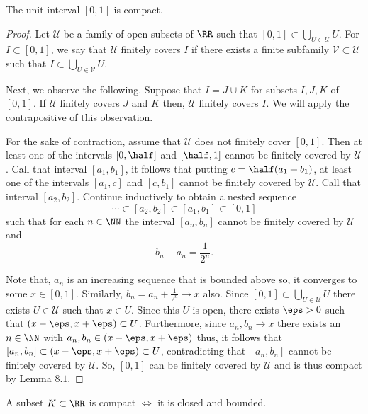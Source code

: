 \documentclass[12pt, a4paper]{article}
\begin{document}
\begin{theorem}
    The unit interval \([0,1]\) is compact.
\end{theorem}

\begin{proof}
    Let \(\mathcal{U}\) be a family of open subsets of \(\RR\) such that \([0,1] \subset \bigcup_{U\in \mathcal{U}} U\). For \(I \subset [0,1]\), we say that \underline{\(\mathcal{U}\) finitely covers \(I\)} if there exists a finite subfamily \(\mathcal{V} \subset \mathcal{U}\) such that \(I \subset \bigcup_{U \in \mathcal{V}} U\). 
    
    Next, we observe the following. Suppose that \(I = J \cup K\) for subsets \(I,J,K\) of \([0,1]\). If \(\mathcal{U}\) finitely covers \(J\) and \(K\) then, \(\mathcal{U}\) finitely covers \(I\). We will apply the contrapositive of this observation.
    
    For the sake of contraction, assume that \(\mathcal{U}\) does not finitely cover \([0,1]\). Then at least one of the intervals \(\left[ 0,\half \right]\) and \(\left[ \half,1 \right]\) cannot be finitely covered by \(\mathcal{U}\). Call that interval \([a_1,b_1]\), it follows that putting \(c = \half (a_1+b_1)\), at least one of the intervals \([a_1,c]\) and \([c,b_1]\) cannot be finitely covered by \(\mathcal{U}\). Call that interval \([a_2,b_2]\). Continue inductively to obtain a nested sequence 
    \[\cdots \subset [a_2,b_2] \subset [a_1,b_1] \subset[0,1]\]
    such that for each \(n \in \NN\) the interval \([a_n,b_n]\) cannot be finitely covered by \(\mathcal{U}\) and 
    \[b_n-a_n = \frac{1}{2^n}.\]
    
    Note that, \(a_n\) is an increasing sequence that is bounded above so, it converges to some \(x \in [0,1]\). Similarly, \(b_n = a_n + \frac{1}{2^n} \to x\) also.
    Since \([0,1] \subset \bigcup_{U \in \mathcal{U}}U\) there exists \(U \in \mathcal{U}\) such that \(x \in U\). Since this \(U\) is open, there exists \(\eps>0\) such that \((x-\eps,x+\eps)\subset U\). Furthermore, since \(a_n,b_n \to x\) there exists an \(n \in \NN\) with \(a_n, b_n \in (x-\eps,x+\eps)\) thus, it follows that \([a_n,b_n] \subset (x-\eps,x+\eps) \subset U\), contradicting that \([a_n,b_n]\) cannot be finitely covered by \(\mathcal{U}\). So, \([0,1]\) can be finitely covered by \(\mathcal{U}\) and is thus compact by Lemma \(8.1\).
\end{proof}

\begin{mdthm}
    A subset \(K \subset \RR\) is compact \(\iff\) it is closed and bounded.
\end{mdthm}
\end{document}
